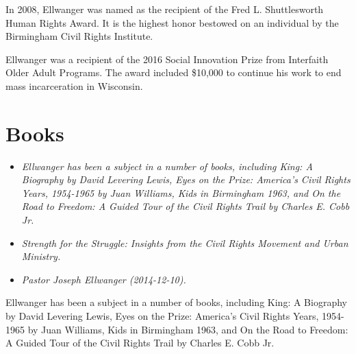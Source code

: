 In 2008, Ellwanger was named as the recipient of the Fred L.
Shuttlesworth Human Rights Award. It is the highest honor bestowed on an
individual by the Birmingham Civil Rights Institute.

Ellwanger was a recipient of the 2016 Social Innovation Prize from
Interfaith Older Adult Programs. The award included \$10,000 to continue
his work to end mass incarceration in Wisconsin.

\section{Books}\label{books}

\begin{itemize}
\item
  \emph{Ellwanger has been a subject in a number of books, including
  King: A Biography by David Levering Lewis, Eyes on the Prize:
  America's Civil Rights Years, 1954-1965 by Juan Williams, Kids in
  Birmingham 1963, and On the Road to Freedom: A Guided Tour of the
  Civil Rights Trail by Charles E. Cobb Jr.}
\item
  \emph{Strength for the Struggle: Insights from the Civil Rights
  Movement and Urban Ministry.}
\item
  \emph{Pastor Joseph Ellwanger (2014-12-10).}
\end{itemize}

Ellwanger has been a subject in a number of books, including King: A
Biography by David Levering Lewis, Eyes on the Prize: America's Civil
Rights Years, 1954-1965 by Juan Williams, Kids in Birmingham 1963, and
On the Road to Freedom: A Guided Tour of the Civil Rights Trail by
Charles E. Cobb Jr.

